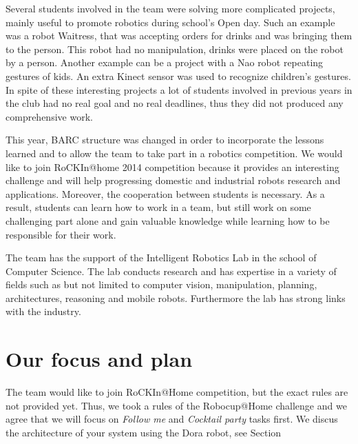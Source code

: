 \documentclass[conference]{IEEEtran}
\begin{document}
Several students involved in the team were solving more complicated projects, mainly useful to promote robotics during school's Open day. Such an example was a robot Waitress, that was accepting orders for drinks and was bringing them to the person. This robot had no manipulation, drinks were placed on the robot by a person. Another example can be a project with a Nao robot repeating gestures of kids. An extra Kinect sensor was used to recognize children's gestures. In spite of these interesting projects a lot of students involved in previous years in the club had no real goal and no real deadlines, thus they did not produced any comprehensive work.

This year, BARC structure was changed in order to incorporate the lessons learned and to allow the team to take part in a robotics competition. We would like to join RoCKIn@home 2014 competition because it provides an interesting challenge and will help progressing domestic and industrial robots research and applications. Moreover, the cooperation between students is necessary. As a result, students can learn how to work in a team, but still work on some challenging part alone and gain valuable knowledge while learning how to be responsible for their work.

The team has the support of the Intelligent Robotics Lab \cite{irlab} in the school of Computer Science. The lab conducts research and has expertise in a variety of fields such as but not limited to computer vision, manipulation, planning, architectures, reasoning and mobile robots. Furthermore the lab has strong links with the industry. 

 
\section{Our focus and plan}
The team would like to join RoCKIn@Home competition, but the exact rules are not provided yet. Thus, we took a rules of the Robocup@Home challenge and we agree that we will focus on \textit{Follow me} and \textit{Cocktail party} tasks first. We discus the architecture of your system using the Dora robot, see Section %
\end{document}
